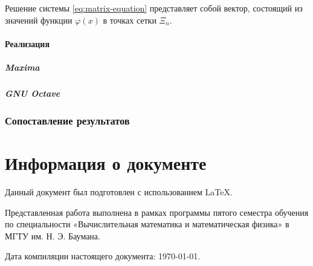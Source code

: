 \documentclass{article}
\numberwithin{equation}{section}
\renewcommand{\phi}{\varphi}
\begin{document}
Решение системы \eqref{eq:matrix-equation} представляет собой вектор,
состоящий из значений функции $\phi(x)$ в точках сетки $\Xi_n$.

\subsection{Реализация}

\subsubsection{Maxima}
\label{sec:numeric-maxima}



\subsubsection{GNU Octave}
\label{sec:numeric-octave}




\section{Сопоставление результатов}
\label{sec:comparison}

\clearpage
\appendix
\part{Информация о документе}

Данный документ был подготовлен с использованием \LaTeX{}.

Представленная работа выполнена в рамках программы пятого семестра
обучения по специальности «Вычислительная математика и математическая
физика» в МГТУ им. Н. Э. Баумана.

Дата компиляции настоящего документа: \today.



\end{document}
